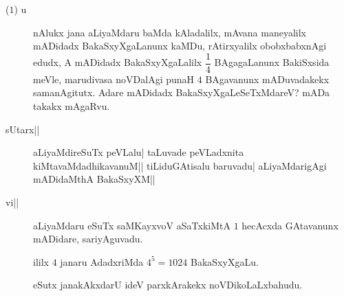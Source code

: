 \newpage



\begin{description}
\item[($1$) u] nAlukx jana aLiyaMdaru baMda kAladalilx, mAvana maneyalilx
  mADidadx BakaSxyXgaLanunx kaMDu, rAtirxyalilx obobxbabxnAgi edudx, A
  mADidadx BakaSxyXgaLalilx $\dfrac{1}{4}$ BAgagaLanunx BakiSxsida
  meVle, marudivasa noVDalAgi punaH $4$ BAgavanunx mADuvadakekx
  samanAgitutx. Adare mADidadx BakaSxyXgaLeSeTxMdareV? mADa takakx mAgaRvu.

\item[sUtarx||] aLiyaMdireSuTx peVLalu| taLuvade peVLadxnita
  kiMtavaMdadhikavanuM|| tiLiduGAtisalu baruvadu| aLiyaMdarigAgi
  mADidaMthA BakaSxyXM||

\item[vi||] aLiyaMdaru eSuTx saMKayxvoV aSaTxkiMtA $1$ hecAcxda
  GAtavanunx mADidare, sariyAguvadu.

  ililx $4$ janaru AdadxriMda $4^5= 1024$ BakaSxyXgaLu.

  eSutx janakAkxdarU ideV parxkArakekx noVDikoLaLxbahudu.
\end{description}

